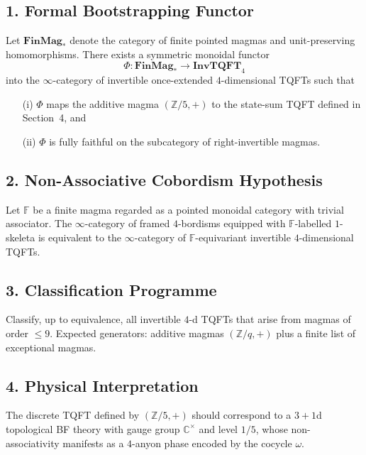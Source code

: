 \documentclass[11pt]{article}
\begin{document}
\subsection*{1.  Formal Bootstrapping Functor}
\begin{conjecture}
Let $\mathbf{FinMag}_*$ denote the category of finite pointed magmas and unit-preserving homomorphisms.
There exists a symmetric monoidal functor
\[
\Phi\colon\mathbf{FinMag}_*\longrightarrow\mathbf{InvTQFT}_{4}
\]
into the $\infty$-category of invertible once-extended $4$-dimensional TQFTs such that
\begin{enumerate}
\item[\normalfont(i)] $\Phi$ maps the additive magma $(\mathbb{Z}/5,+)$ to the state-sum TQFT defined in Section~4, and
\item[\normalfont(ii)] $\Phi$ is fully faithful on the subcategory of right-invertible magmas.
\end{enumerate}
\end{conjecture}

\subsection*{2.  Non-Associative Cobordism Hypothesis}
\begin{conjecture}
Let $\mathbb F$ be a finite magma regarded as a pointed monoidal category with trivial associator.
The $\infty$-category of framed $4$-bordisms equipped with $\mathbb F$-labelled $1$-skeleta is equivalent to the $\infty$-category of $\mathbb F$-equivariant invertible $4$-dimensional TQFTs.
\end{conjecture}

\subsection*{3.  Classification Programme}
Classify, up to equivalence, all invertible $4$-d TQFTs that arise from magmas of order $\le 9$.
Expected generators: additive magmas $(\mathbb{Z}/q,+)$ plus a finite list of exceptional magmas.

\subsection*{4.  Physical Interpretation}
The discrete TQFT defined by $(\mathbb{Z}/5,+)$ should correspond to a $3{+}1$d topological BF theory with gauge group $\mathbb{C}^\times$ and level $1/5$, whose non-associativity manifests as a $4$-anyon phase encoded by the cocycle $\omega$.
\end{document}
